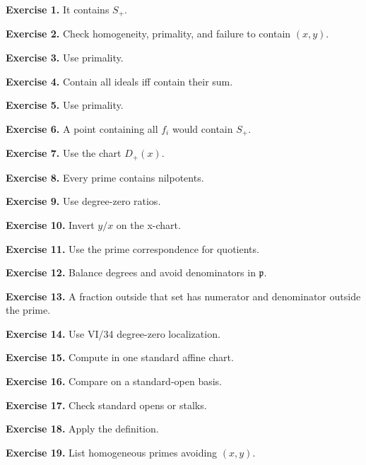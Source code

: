 \textbf{Exercise 1.} It contains \(S_+\).\par

\textbf{Exercise 2.} Check homogeneity, primality, and failure to contain \((x,y)\).\par

\textbf{Exercise 3.} Use primality.\par

\textbf{Exercise 4.} Contain all ideals iff contain their sum.\par

\textbf{Exercise 5.} Use primality.\par

\textbf{Exercise 6.} A point containing all \(f_i\) would contain \(S_+\).\par

\textbf{Exercise 7.} Use the chart \(D_+(x)\).\par

\textbf{Exercise 8.} Every prime contains nilpotents.\par

\textbf{Exercise 9.} Use degree-zero ratios.\par

\textbf{Exercise 10.} Invert \(y/x\) on the x-chart.\par

\textbf{Exercise 11.} Use the prime correspondence for quotients.\par

\textbf{Exercise 12.} Balance degrees and avoid denominators in \(\mathfrak p\).\par

\textbf{Exercise 13.} A fraction outside that set has numerator and denominator outside the prime.\par

\textbf{Exercise 14.} Use VI/34 degree-zero localization.\par

\textbf{Exercise 15.} Compute in one standard affine chart.\par

\textbf{Exercise 16.} Compare on a standard-open basis.\par

\textbf{Exercise 17.} Check standard opens or stalks.\par

\textbf{Exercise 18.} Apply the definition.\par

\textbf{Exercise 19.} List homogeneous primes avoiding \((x,y)\).\par

